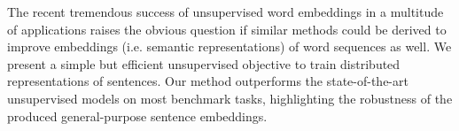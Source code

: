 The recent tremendous success of unsupervised word embeddings in a multitude of applications raises the obvious question if similar methods could be derived to improve embeddings (i.e. semantic representations) of word sequences as well. We present a simple but efficient unsupervised objective to train distributed representations of sentences. Our method outperforms the state-of-the-art unsupervised models on most benchmark tasks, highlighting the robustness of the produced general-purpose sentence embeddings.
